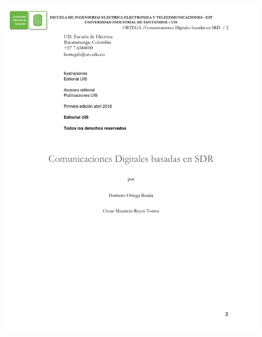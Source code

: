 \newpage
\begin{center}
\pagestyle{plain}
\includegraphics[trim = 2mm 19mm 19mm 1mm, clip,width=\textwidth]{Imagenes/Contraportada}%
\par
\end{center}

